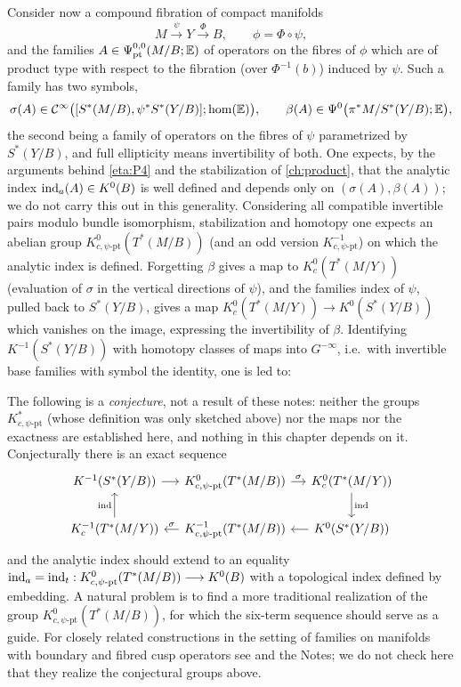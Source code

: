 Consider now a compound fibration of compact manifolds
\[
M\xrightarrow{\ \psi\ }Y\xrightarrow{\ \Phi\ }B,\qquad\phi=\Phi\circ\psi,
\]
and the families $A\in\Psi^{0,0}_{\mathrm{pt}}(M/B;\mathbb E)$ of operators on the fibres of $\phi$
which are of product type with respect to the fibration (over $\Phi^{-1}(b)$) induced by
$\psi$. Such a family has two symbols,
\[
\sigma(A)\in\mathcal{C}^\infty\bigl([S^*(M/B),\psi^*S^*(Y/B)];\hom(\mathbb E)\bigr),\qquad
\beta(A)\in\Psi^{0}\bigl(\pi^*M/S^*(Y/B);\mathbb E\bigr),
\]
the second being a family of operators on the fibres of $\psi$ parametrized by
$S^*(Y/B)$, and full ellipticity means invertibility of both. One expects, by the
arguments behind \ref{eta:P4} and the stabilization of \cref{ch:product}, that the
analytic index $\operatorname{ind}_a(A)\in K^0(B)$ is well defined and depends only on
$(\sigma(A),\beta(A))$; we do not carry this out in this generality. Considering all compatible invertible pairs modulo bundle
isomorphism, stabilization and homotopy one expects an abelian group
$K^0_{c,\psi\text{-pt}}(T^*(M/B))$ (and an odd version $K^{-1}_{c,\psi\text{-pt}}$) on which
the analytic index is defined. Forgetting $\beta$ gives a map to $K^0_c(T^*(M/Y))$
(evaluation of $\sigma$ in the vertical directions of $\psi$), and the families index
of $\psi$, pulled back to $S^*(Y/B)$, gives a map
$K^0_c(T^*(M/Y))\longrightarrow K^0(S^*(Y/B))$ which vanishes on the image, expressing the
invertibility of $\beta$. Identifying $K^{-1}(S^*(Y/B))$ with homotopy classes of maps into
$G^{-\infty}$, i.e.\ with invertible base families with symbol the identity, one is led to:

\begin{remark}\label{eta:rem:six-term}
The following is a \emph{conjecture}, not a result of these notes: neither the
groups $K^{*}_{c,\psi\text{-pt}}$ (whose definition was only sketched above) nor the
maps nor the exactness are established here, and nothing in this chapter depends on
it. Conjecturally there is an exact sequence
\[
\begin{tikzcd}[column sep=small]
K^{-1}(S^*(Y/B))\arrow[r] & K^0_{c,\psi\text{-pt}}(T^*(M/B))\arrow[r,"\sigma"] &
K^0_c(T^*(M/Y))\arrow[d,"\ind"]\\
K^{-1}_c(T^*(M/Y))\arrow[u,"\ind"] & K^{-1}_{c,\psi\text{-pt}}(T^*(M/B))\arrow[l,"\sigma"'] &
K^0(S^*(Y/B))\arrow[l]
\end{tikzcd}
\]
and the analytic index should extend to an equality
$\operatorname{ind}_a=\operatorname{ind}_t:K^0_{c,\psi\text{-pt}}(T^*(M/B))\longrightarrow K^0(B)$ with a topological
index defined by embedding. A natural problem is to find a more traditional
realization of the group $K^0_{c,\psi\text{-pt}}(T^*(M/B))$, for which the six-term
sequence should serve as a guide. For closely related constructions in the setting
of families on manifolds with boundary and fibred cusp operators see
\cite{Melrose-Rochon} and the Notes; we do not check here that they realize the
conjectural groups above.
\end{remark}

